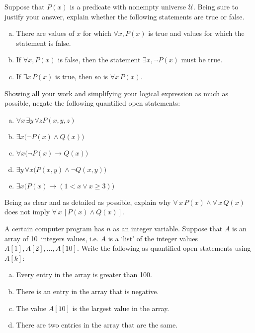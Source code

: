 \documentclass[11pt,letterpaper]{article}
\begin{document}

 Suppose that $P(x)$ is a predicate with nonempty universe $\mathcal{U}$. Being sure to justify your answer, explain whether the following statements are true or false.
	\begin{enumerate}[(a)]
	\item There are values of $x$ for which $\forall x, P(x)$ is true and values for which the statement is false. 
	\item If $\forall x, P(x)$ is false, then the statement $\exists x, \neg P(x)$ must be true. 
	\item If $\exists x\, P(x)$ is true, then so is $\forall x\, P(x)$.
	\end{enumerate} 



\newpage



 Showing all your work and simplifying your logical expression as much as possible, negate the following quantified open statements:
	\begin{enumerate}[(a)]
	\item $\forall x\, \exists y\, \forall z P(x, y, z)$
	\item $\exists x \big( \neg P(x) \wedge Q(x) \big)$
	\item $\forall x \big( \neg P(x) \to Q(x) \big)$
	\item $\exists y\, \forall x \big( P(x, y) \wedge \neg Q(x, y) \big)$
	\item $\exists x \big( P(x) \to (1 < x \vee x \geq 3) \big)$
	\end{enumerate} 



\newpage



 Being as clear and as detailed as possible, explain why $\forall\, x\, P(x) \wedge \forall\, x\, Q(x)$ does not imply $\forall\, x \, [P(x) \wedge Q(x)]$. 





\newpage



 A certain computer program has $n$ as an integer variable. Suppose that $A$ is an array of 10~integers values, i.e. $A$ is a `list' of the integer values $A[1], A[2], \ldots, A[10]$. Write the following as quantified open statements using $A[k]$:
	\begin{enumerate}[(a)]
	\item Every entry in the array is greater than 100.
	\item There is an entry in the array that is negative. 
	\item The value $A[10]$ is the largest value in the array.
	\item There are two entries in the array that are the same. 
	\end{enumerate} 
\end{document}

